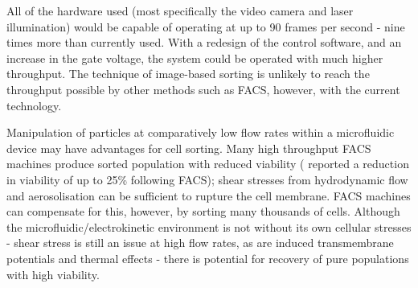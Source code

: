 All of the hardware used (most specifically the video camera and laser illumination) would be capable of operating at up to 90 frames per second - nine times more than currently used. With a redesign of the control software, and an increase in the gate voltage, the system could be operated with much higher throughput. The technique of image-based sorting is unlikely to reach the throughput possible by other methods such as FACS, however, with the current technology.

Manipulation of particles at comparatively low flow rates within a microfluidic device may have advantages for cell sorting. Many high throughput FACS machines produce sorted population with reduced viability (\cite{Seidl:1999} reported a reduction in viability of up to 25\% following FACS); shear stresses from hydrodynamic flow and aerosolisation can be sufficient to rupture the cell membrane. FACS machines can compensate for this, however, by sorting many thousands of cells. Although the microfluidic/electrokinetic environment is not without its own cellular stresses - shear stress is still an issue at high flow rates, as are induced transmembrane potentials and thermal effects - there is potential for recovery of pure populations with high viability.
